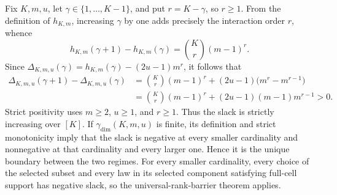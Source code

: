 Fix \(K,m,u\), let \(\gamma\in\{1,\ldots,K-1\}\), and put \(r=K-\gamma\), so \(r\ge1\). From the definition of \(h_{K,m}\), increasing \(\gamma\) by one adds precisely the interaction order \(r\), whence
\[h_{K,m}(\gamma+1)-h_{K,m}(\gamma)=\binom Kr(m-1)^r.\]
Since \(\Delta_{K,m,u}(\gamma)=h_{K,m}(\gamma)-(2u-1)m^r\), it follows that
\[\begin{aligned}\Delta_{K,m,u}(\gamma+1)-\Delta_{K,m,u}(\gamma)&=\binom Kr(m-1)^r+(2u-1)\bigl(m^r-m^{r-1}\bigr)\\&=\binom Kr(m-1)^r+(2u-1)(m-1)m^{r-1}>0.\end{aligned}\]
Strict positivity uses \(m\ge2\), \(u\ge1\), and \(r\ge1\). Thus the slack is strictly increasing over \([K]\). If \(\gamma_{\mathrm{dim}}(K,m,u)\) is finite, its definition and strict monotonicity imply that the slack is negative at every smaller cardinality and nonnegative at that cardinality and every larger one. Hence it is the unique boundary between the two regimes. For every smaller cardinality, every choice of the selected subset and every law in its selected component satisfying full-cell support has negative slack, so the universal-rank-barrier theorem applies.